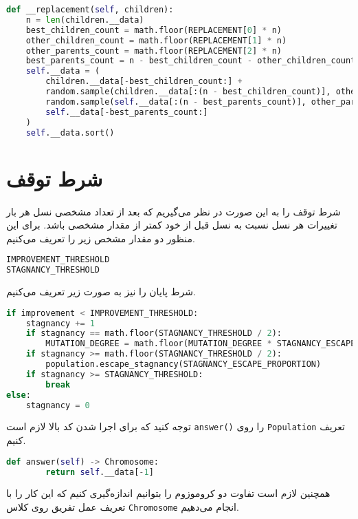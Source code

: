 \documentclass[a4paper, 12pt]{article}
\theoremstyle{definition}
\begin{document}
\LTR
\begin{lstlisting}[language=Python]
def __replacement(self, children):
    n = len(children.__data)
    best_children_count = math.floor(REPLACEMENT[0] * n)
    other_children_count = math.floor(REPLACEMENT[1] * n)
    other_parents_count = math.floor(REPLACEMENT[2] * n)
    best_parents_count = n - best_children_count - other_children_count - other_parents_count
    self.__data = (
        children.__data[-best_children_count:] +
        random.sample(children.__data[:(n - best_children_count)], other_children_count) +
        random.sample(self.__data[:(n - best_parents_count)], other_parents_count) +
        self.__data[-best_parents_count:]
    )
    self.__data.sort()
\end{lstlisting}
\RTL

\section{شرط توقف}
شرط توقف را به این صورت در نظر می‌گیریم که بعد از تعداد مشخصی نسل هر بار تغییرات هر نسل نسبت به نسل قبل از خود کمتر از مقدار مشخصی باشد. برای این منظور دو مقدار مشخص زیر را تعریف می‌کنیم.

\LTR
\begin{lstlisting}[language=Python]
IMPROVEMENT_THRESHOLD
STAGNANCY_THRESHOLD
\end{lstlisting}
\RTL

شرط پایان را نیز به صورت زیر تعریف می‌کنیم.

\LTR
\begin{lstlisting}[language=Python]
if improvement < IMPROVEMENT_THRESHOLD:
    stagnancy += 1
    if stagnancy == math.floor(STAGNANCY_THRESHOLD / 2):
        MUTATION_DEGREE = math.floor(MUTATION_DEGREE * STAGNANCY_ESCAPE_DEGREE)
    if stagnancy >= math.floor(STAGNANCY_THRESHOLD / 2):
        population.escape_stagnancy(STAGNANCY_ESCAPE_PROPORTION)
    if stagnancy >= STAGNANCY_THRESHOLD:
        break
else:
    stagnancy = 0
\end{lstlisting}
\RTL

توجه کنید که برای اجرا شدن کد بالا لازم است
\texttt{answer()}
را روی
\texttt{Population}
تعریف کنیم.

\LTR
\begin{lstlisting}[language=Python]
    def answer(self) -> Chromosome:
        return self.__data[-1]
\end{lstlisting}
\RTL

همچنین لازم است تفاوت دو کروموزوم را بتوانیم اندازه‌گیری کنیم که این کار را با تعریف عمل تفریق روی کلاس
\texttt{Chromosome}
انجام می‌دهیم.
\end{document}
